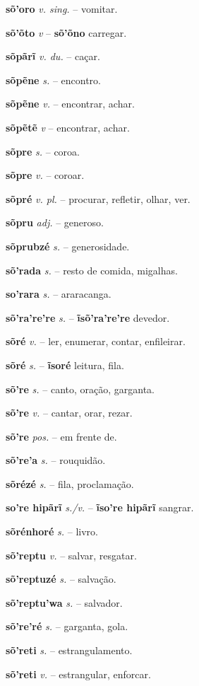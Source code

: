\textbf{sõ'oro} \textit{v. sing.} -- vomitar.

\textbf{sõ'õto} \textit{v} -- \textbf{sõ'õno} carregar.

\textbf{sõpãrĩ} \textit{v. du.} -- caçar.

\textbf{sõpẽne} \textit{s.} -- encontro.

\textbf{sõpẽne} \textit{v.} -- encontrar, achar.

\textbf{sõpẽtẽ} \textit{v} -- encontrar, achar.

\textbf{sõpre} \textit{s.} -- coroa.

\textbf{sõpre} \textit{v.} -- coroar.

\textbf{sõpré} \textit{v. pl.} -- procurar, refletir, olhar, ver.

\textbf{sõpru} \textit{adj.} -- generoso.

\textbf{sõprubzé} \textit{s.} -- generosidade.

\textbf{sõ'rada} \textit{s.} -- resto de comida, migalhas.

\textbf{so'rara} \textit{s.} -- araracanga.

\textbf{sõ'ra're're} \textit{s.} -- \textbf{ĩsõ'ra're're} devedor.

\textbf{sõré} \textit{v.} -- ler, enumerar, contar, enfileirar.

\textbf{sõré} \textit{s.} -- \textbf{ĩsoré} leitura, fila.

\textbf{sõ're} \textit{s.} -- canto, oração, garganta.

\textbf{sõ're} \textit{v.} -- cantar, orar, rezar.

\textbf{sõ're} \textit{pos.} -- em frente de.

\textbf{sõ're'a} \textit{s.} -- rouquidão.

\textbf{sõrézé} \textit{s.} -- fila, proclamação.

\textbf{so're hipãrĩ} \textit{s./v.} -- \textbf{ĩso're hipãrĩ} sangrar.

\textbf{sõrénhoré} \textit{s.} -- livro.

\textbf{sõ'reptu} \textit{v.} -- salvar, resgatar.

\textbf{sõ'reptuzé} \textit{s.} -- salvação.

\textbf{sõ'reptu'wa} \textit{s.} -- salvador.

\textbf{sõ're'ré} \textit{s.} -- garganta, gola.

\textbf{sõ'reti} \textit{s.} -- estrangulamento.

\textbf{sõ'reti} \textit{v.} -- estrangular, enforcar.

